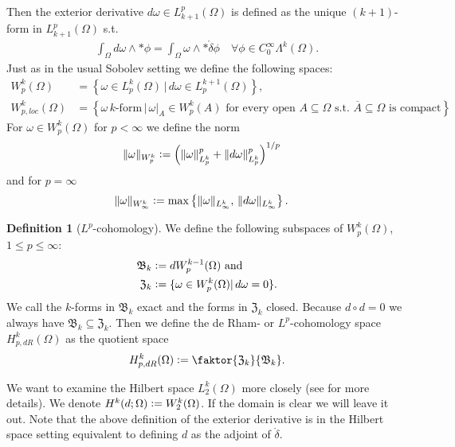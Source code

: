 \documentclass[12pt,a4paper]{article}
\theoremstyle{definition}
\newtheorem{definition}{Definition}
\newcommand{\lpcoho}{H^k_{p,dR}}
\newcommand{\norm}[1]{\lVert #1 \rVert}
\begin{document}
Then the exterior derivative $ d\omega \in L^p_{k+1}(\Omega)$ is defined as
the unique $(k+1)$-form in $L^p_{k+1}(\Omega)$ s.t. 
\begin{align*}
\int_\Omega d\omega \wedge *\phi = \int_\Omega \omega \wedge 
*\mathring{\delta}\phi
\quad \forall \phi \in C_0^\infty \Lambda^{k}(\Omega).
\end{align*}
Just as in the usual Sobolev setting we define the following spaces:
\begin{align*}
W^k_p(\Omega) &= \left\{ \omega \in L^k_p(\Omega)\, | 
    \, d\omega \in L_p^{k+1}(\Omega) \right\}, \\ 
W^k_{p,loc}(\Omega) &= \left\{ \omega \, k \text{-form} \, | \,
\omega|_A \in W^k_p(A) \text{ for every open } A \subseteq \Omega 
\text{ s.t. } \overline{A} \subseteq \Omega \text{ is compact} %
\right\}.
\end{align*}
For $\omega \in W^k_p(\Omega)$ for $p<\infty$ we define the norm 
\begin{align*}
\lVert \omega \rVert _{W^k_p} &\vcentcolon= 
\left( \norm{\omega}^p_{L^k_p} + \norm{d\omega}^p_{L^k_p} \right)^{1/p}
\end{align*}
and for $p=\infty$
\begin{align*}
    \lVert \omega \rVert _{W^k_\infty} &\vcentcolon= 
    \max\left\{ \norm{\omega}_{L^k_\infty},\, \norm{d\omega}_{L^k_\infty}
    \right\}.
\end{align*}
    
\begin{definition}[$L^p$-cohomology]
    We define the following subspaces of $W^k_p(\Omega)$, $1\leq p \leq\infty$:
    \begin{align*}
        \mathfrak{B}_k &\vcentcolon= dW^{k-1}_p(\Omega) \text{ and} \\
        \mathfrak{Z}_k &\vcentcolon= \{ \omega \in W^k_p(\Omega)| 
        \, d\omega = 0\}.
    \end{align*}
    We call the $k$-forms in $\mathfrak{B}_k$ exact and the forms in 
    $\mathfrak{Z}_k$ closed. Because $d \circ d=0$ we always have  
    $\mathfrak{B}_k \subseteq \mathfrak{Z}_k$.
    Then we define the de Rham- or $L^p$-cohomology space $\lpcoho(\Omega)$ as 
    the quotient space
    \begin{align*}
        \lpcoho (\Omega) \vcentcolon= \faktor{\mathfrak{Z}_k}{\mathfrak{B}_k}.
    \end{align*}
\end{definition}
\vspace{0.5cm}
We want to examine the Hilbert space $L^k_2(\Omega)$ more closely
(see \cite[Sec. 6.2.6]{arnold} for more details).  
We denote $H^k(d;\Omega) \vcentcolon= W^k_2(\Omega)$. If the domain is clear
we will leave it out. Note that the above definition of the exterior derivative
is in the Hilbert space setting equivalent to defining $d$ as the adjoint
of $\mathring{\delta}$. 
\end{document}
